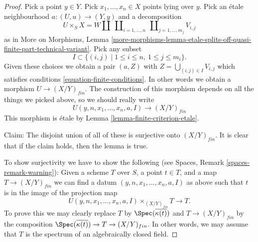 \begin{proof}
\medskip\noindent
Pick a point $y \in Y$. Pick $x_1, \ldots, x_n \in X$ points
lying over $y$. Pick an \'etale neighbourhood $a : (U, u) \to (Y, y)$ and a
decomposition
$$
U \times_S X =
W \amalg
\ \coprod\nolimits_{i = 1, \ldots, n}
\ \coprod\nolimits_{j = 1, \ldots, m_j}
V_{i, j}
$$
as in
More on Morphisms, Lemma
\ref{more-morphisms-lemma-etale-splits-off-quasi-finite-part-technical-variant}.
Pick any subset
$$
I \subset \{(i, j) \mid 1 \leq i \leq n, \ 1 \leq j \leq m_i\}.
$$
Given these choices we obtain a pair $(a, Z)$ with
$Z = \bigcup_{(i, j) \in I} V_{i, j}$
which satisfies conditions \ref{equation-finite-conditions}. In other words
we obtain a morphism $U \to (X/Y)_{fin}$. The construction of this morphism
depends on all the things we picked above, so we should really write
$$
U(y, n, x_1, \ldots, x_n, a, I) \longrightarrow (X/Y)_{fin}
$$
This morphism is \'etale by Lemma \ref{lemma-finite-criterion-etale}.

\medskip\noindent
Claim: The disjoint union of all of these is surjective onto $(X/Y)_{fin}$.
It is clear that if the claim holds, then the lemma is true.

\medskip\noindent
To show surjectivity we have to show the following (see
Spaces, Remark \ref{spaces-remark-warning}): Given a scheme $T$ over
$S$, a point $t \in T$, and a map $T \to (X/Y)_{fin}$ we can find a datum
$(y, n, x_1, \ldots, x_n, a, I)$ as above such that
$t$ is in the image of the projection map
$$
U(y, n, x_1, \ldots, x_n, a, I) \times_{(X/Y)_{fin}} T \longrightarrow T.
$$
To prove this we may clearly replace $T$ by
$\Spec(\overline{\kappa(t)})$ and
$T \to (X/Y)_{fin}$ by the composition
$\Spec(\overline{\kappa(t)}) \to T \to (X/Y)_{fin}$.
In other words, we may assume that $T$ is
the spectrum of an algebraically closed field.


\end{proof}
